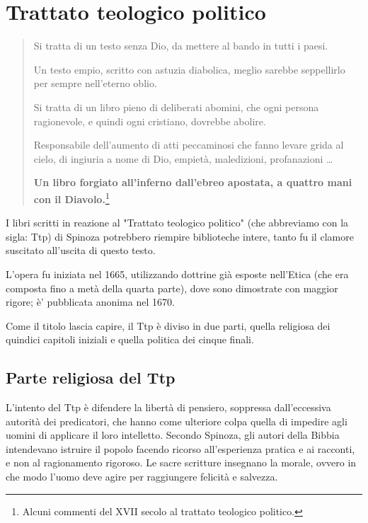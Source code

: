 \chapter{Trattato teologico politico}

\bigskip
\bigskip

\begin{quotation}
	\small Si tratta di un testo senza Dio, da mettere al bando in tutti i paesi.
	
	Un testo empio, scritto con astuzia diabolica, meglio sarebbe seppellirlo per sempre nell'eterno oblio.
	
	Si tratta di un libro pieno di deliberati abomini, che ogni persona ragionevole, e quindi ogni cristiano, dovrebbe abolire.
	
	Responsabile dell'aumento di atti peccaminosi che fanno levare grida al cielo, di ingiuria a nome di Dio, empietà, maledizioni, profanazioni \dots
	
	\textbf{Un libro forgiato all'inferno dall'ebreo apostata, a quattro mani con il Diavolo.}\footnote{Alcuni commenti del XVII secolo al trattato teologico politico.}
		
\end{quotation}

I libri scritti in reazione al "Trattato teologico politico" (che abbreviamo con la sigla: Ttp) di Spinoza potrebbero riempire biblioteche intere, tanto fu il clamore suscitato all'uscita di questo testo.

L'opera fu iniziata nel 1665, utilizzando dottrine già esposte nell'Etica (che era composta fino a metà della quarta parte), dove sono dimostrate con maggior rigore; è' pubblicata anonima nel 1670. 

Come il titolo lascia capire, il Ttp è diviso in due parti, quella religiosa dei quindici capitoli iniziali e quella politica dei cinque finali.

\section[Parte religiosa]{Parte religiosa del Ttp}

L'intento del Ttp è difendere la libertà di pensiero, soppressa dall'eccessiva autorità dei predicatori, che hanno come ulteriore colpa quella di impedire agli uomini di applicare il loro intelletto. Secondo Spinoza, gli autori della Bibbia intendevano istruire il popolo facendo ricorso all'esperienza pratica e ai racconti, e non al ragionamento rigoroso. Le sacre scritture insegnano la morale, ovvero in che modo l'uomo deve agire per raggiungere felicità e salvezza. 

